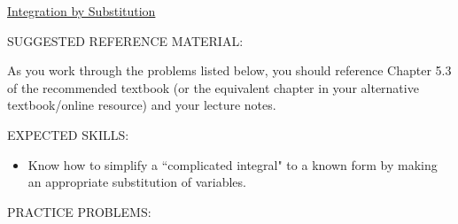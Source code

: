 \documentclass[12pt]{article}
\begin{document}
\begin{center}
\underline{\LARGE{Integration by Substitution}}
\end{center}

\noindent SUGGESTED REFERENCE MATERIAL:

\bigskip

\noindent As you work through the problems listed below, you should reference Chapter 5.3 of the recommended textbook (or the equivalent chapter in your alternative textbook/online resource) and your lecture notes.

\bigskip

\noindent EXPECTED SKILLS:

\begin{itemize}

\item Know how to simplify a ``complicated integral" to a known form by making an appropriate substitution of variables.

\end{itemize}

\noindent PRACTICE PROBLEMS:

\medskip

\end{document}
